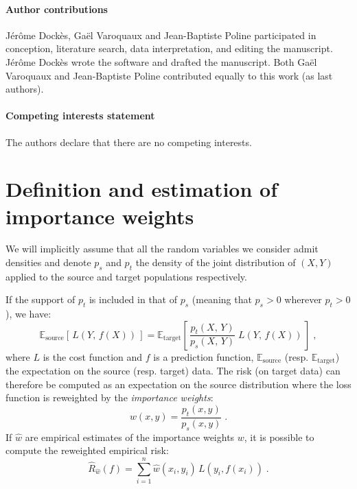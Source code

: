 \documentclass[a4paper,num-refs]{oup-contemporary}
\newcommand{\E}{ \mathbb{E} }
\begin{document}
\paragraph{Author contributions}
Jérôme Dockès, Gaël Varoquaux and Jean-Baptiste Poline participated in
conception, literature search, data interpretation, and editing the manuscript.
Jérôme Dockès wrote the software and drafted the manuscript. Both Gaël Varoquaux
and Jean-Baptiste Poline contributed equally to this work (as last authors).

\paragraph{Competing interests statement}
The authors declare that there are no competing interests.


\appendix
\section{Definition and estimation of importance weights}
\label{sec:definition-estimation-iw}
%
We will implicitly assume that all the random variables we consider admit
densities and denote \(p_s\) and \(p_t\) the density of the joint distribution of \((X, Y)\) applied
to the source and target populations respectively.

If the support of \(p_t\) is included in that of \(p_s\) (meaning that \(p_s > 0
\) wherever \( p_t > 0\)), we have:
%
\begin{equation}
\E_{\text{source}}[\,L(Y,\,f(X))\,] = \E_{\text{target}}\left[\,\frac{p_t(X,\,Y)}{p_s(X,\,Y)}\;L(Y,\,f(X))\,\right] \; ,
\end{equation}
%
where \(L\) is the cost function and \(f\) is a prediction function, \(\E_{\text{source}}\) (resp. \(\E_{\text{target}}\)) the expectation on the source (resp. target) data.
%
The risk (on target data) can therefore be computed as an expectation on the
source distribution where the loss function is reweighted by the
\emph{importance weights}:
%
\begin{equation}\label{eq:importance-weight-definition}
w(x,y) = \frac{p_t(x,y)}{p_s(x,y)} \; .
\end{equation}
%
If \(\hat{w}\) are empirical estimates  of the importance weights \(w\), it is possible to compute the reweighted empirical risk:
%
\begin{equation}
\hat{R}_{\hat{w}}(f) = \sum_{i=1}^n \hat{w}(x_i, y_i)\,L(y_i, f(x_i)) \; .
\end{equation}
%
%
%
\end{document}
